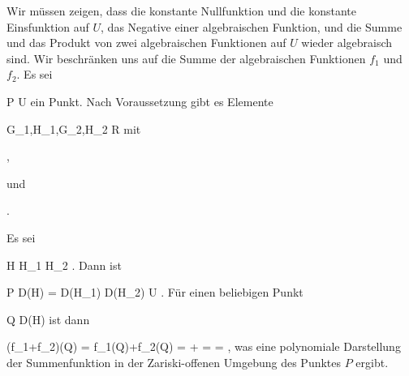 {





Wir müssen zeigen, dass die konstante Nullfunktion und die konstante Einsfunktion auf $U$, das Negative einer algebraischen Funktion, und die Summe und das Produkt von zwei algebraischen Funktionen auf $U$ wieder algebraisch sind. Wir beschränken uns auf die Summe der algebraischen Funktionen $f_1$ und $f_2$. Es sei

\mavergleichskette
{\vergleichskette
{ P
}
{ \in }{ U
}
{  }{
}
{    }{
}
{   }{
}
}
{}{}{}
ein Punkt. Nach Voraussetzung gibt es Elemente

\mavergleichskette
{\vergleichskette
{ G_1,H_1,G_2,H_2
}
{ \in }{ R
}
{  }{
}
{    }{
}
{   }{
}
}
{}{}{}
mit

 { , }

und

 { . }

Es sei

\mavergleichskettedisp
{\vergleichskette
{ H
}
{ } { H_1 H_2
}
{ } {
}
{ } {
}
{ } {
}
}
{}{}{.}
Dann ist

\mavergleichskette
{\vergleichskette
{ P
}
{ \in }{ D(H)
}
{ = }{ D(H_1) \cap D(H_2)
}
{ \subseteq   }{ U
}
{   }{
}
}
{}{}{.}
Für einen beliebigen Punkt

\mavergleichskette
{\vergleichskette
{ Q
}
{ \in }{ D(H)
}
{  }{
}
{    }{
}
{   }{
}
}
{}{}{}
ist dann

\mavergleichskettealign
{\vergleichskettealign
{ (f_1+f_2)(Q)
}
{ =} { f_1(Q)+f_2(Q)
}
{ =} {  + 
}
{ =} { 
}
{ =} { 
}
}
{}
{}{,}
was eine polynomiale Darstellung der Summenfunktion in der Zariski-offenen Umgebung
 des Punktes $P$ ergibt.




}






